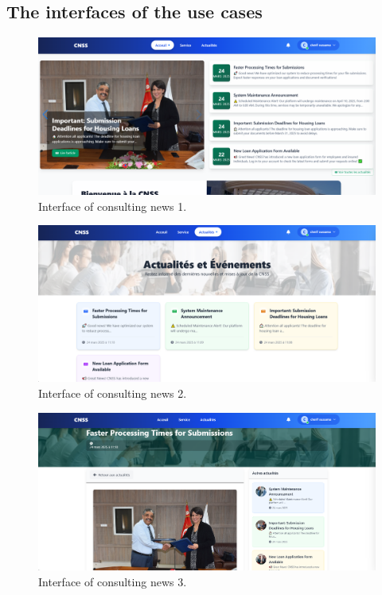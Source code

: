 \subsection{The interfaces of the use cases}
\begin{figure}[h!]
    \centering
    \includegraphics[width=1\textwidth]{figures/ui-see news1.png}
    \caption{Interface of consulting news 1.}
\end{figure}
\clearpage
\begin{figure}[h!]
    \centering
    \includegraphics[width=1\textwidth]{figures/ui-see news2.png}
    \caption{Interface of consulting news 2.}
\end{figure}
\vspace{1.5cm}
\begin{figure}[h!]
    \centering
    \includegraphics[width=1\textwidth]{figures/ui-see news3.png}
    \caption{Interface of consulting news 3.}
\end{figure}
